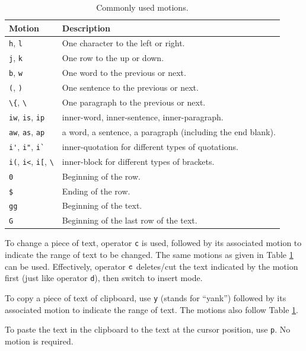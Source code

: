 \begin{table}
  \centering \caption{Commonly used motions.}\label{ch3tab:motion}
  \begin{tabularx}{\textwidth}{lX}
    \hline
    Motion & Description \\ \hline
    \verb|h|, \verb|l| & One character to the left or right. \\ \hdashline
    \verb|j|, \verb|k| & One row to the up or down. \\ \hdashline
    \verb|b|, \verb|w| & One word to the previous or next. \\ \hdashline
    \verb|(|, \verb|)| & One sentence to the previous or next. \\ \hdashline
    \lstinline{\{}, \lstinline{\}} & One paragraph to the previous or next. \\ \hdashline
    \verb|iw|, \verb|is|, \verb|ip| & inner-word, inner-sentence, inner-paragraph. \\ \hdashline
    \verb|aw|, \verb|as|, \verb|ap| & a word, a sentence, a paragraph (including the end blank). \\ \hdashline
    \verb|i'|, \verb|i"|, \verb|i`| & inner-quotation for different types of quotations. \\ \hdashline
    \verb|i(|, \verb|i<|, \verb|i[|, \lstinline{\}} & inner-block for different types of brackets. \\ \hdashline
    \verb|0| & Beginning of the row. \\ \hdashline
    \verb|$| & Ending of the row. \\ \hdashline
    \verb|gg| & Beginning of the text. \\ \hdashline
    \verb|G| & Beginning of the last row of the text. \\
    \hline
  \end{tabularx}
\end{table}

To change a piece of text, operator \verb|c| is used, followed by its associated motion to indicate the range of text to be changed. The same motions as given in Table \ref{ch3tab:motion} can be used. Effectively, operator $\verb|c|$ deletes/cut the text indicated by the motion first (just like operator \verb|d|), then switch to insert mode.

To copy a piece of text of clipboard, use \verb|y| (stands for ``yank'') followed by its associated motion to indicate the range of text. The motions also follow Table \ref{ch3tab:motion}.

To paste the text in the clipboard to the text at the cursor position, use \verb|p|. No motion is required.

